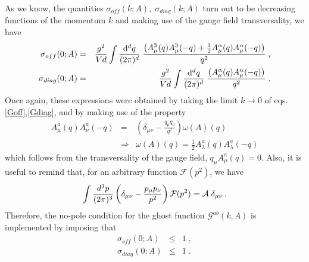 As we know, the quantities $\sigma_{off}(k;A), \; \sigma_{diag}(k;A)$ turn out to be  decreasing functions of the momentum $k$ and making use of the gauge field transversality, we have
\begin{eqnarray}
\sigma _{off}(0;A) &=&  \frac{g^{2}}{Vd}  \int \frac{\mathrm{d}^{d}q}{(2\pi )^{d}} \; \frac{\left( A_{\mu }^{3}(q)A_{\mu }^{3}(-q)+\frac{1}{2}A_{\mu }^{\alpha}(q)A_{\mu }^{\alpha }(-q)\right) }{q^{2}}  \;, 
\nonumber  \\
\sigma _{diag}(0;A) &=& \frac{g^{2}}{Vd}  \int {\frac{\ensuremath{\mathrm{d}}^{d}q}{(2\pi )^{d}} \; \frac{ \left( A_{\mu }^{\alpha }(q) A_{\mu }^{\alpha }(-q)\right) }{q^{2}}}    \;.
\label{sigma}
\end{eqnarray}
Once again, these expressions were obtained by taking the limit $k \rightarrow 0$ of eqs.\eqref{Goff},\eqref{Gdiag}, and by making use of the property
\begin{eqnarray}
A_{\mu }^{a}(q)A_{\nu }^{a}(-q) &=&\left( \delta _{\mu \nu }-\frac{q_{\mu }q_{\nu }%
}{q^{2}}\right) \omega (A)(q)   \nonumber \\
&\Rightarrow &\omega (A)(q)=\frac{1}{2}A_{\lambda }^{a}(q)A_{\lambda }^{a}(-q)
\end{eqnarray}
which follows from the transversality of the gauge field, $q_\mu A^a_\mu(q)=0$. Also, it is useful to remind that, for an arbitrary function $\mathcal{F}(p^2)$, we have
\begin{equation}
\int \frac{d^{3}p}{(2\pi )^{3}}\left( \delta _{\mu \nu }-\frac{%
p_{\mu }p_{\nu }}{p^{2}}\right) \mathcal{F}(p^2)=\mathcal{A}\;\delta _{\mu \nu } \,.
\end{equation}%
Therefore, the no-pole condition for the ghost function $\mathcal{G}^{ab}(k,A)$ is implemented by imposing that \cite{Gribov:1977wm,Vandersickel:2012tz,Sobreiro:2005ec}
\begin{eqnarray}
\sigma _{off}(0;A) &\leq &1\;, \nonumber \\
\sigma _{diag}(0;A) &\leq &1   \label{np} \;.
\end{eqnarray}


